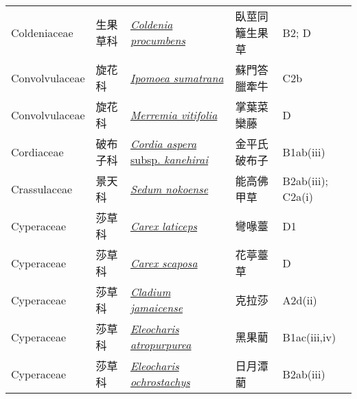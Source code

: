{\begin{longtable}{p{2.5cm}p{2.5cm}p{4.5cm}p{2.5cm}p{3cm}}
    Coldeniaceae & 生果草科 & \href{http://www.theplantlist.org/tpl1.1/search?q=Coldenia+procumbens}{\textit{Coldenia procumbens} } & 臥莖同籬生果草 & B2; D \index{Coldenia@\textit{Coldenia}!procumbens@\textit{procumbens}}  \index{臥莖同籬生果草} \\
    Convolvulaceae & 旋花科 & \href{http://www.theplantlist.org/tpl1.1/search?q=Ipomoea+sumatrana}{\textit{Ipomoea sumatrana} } & 蘇門答臘牽牛 & C2b \index{Ipomoea@\textit{Ipomoea}!sumatrana@\textit{sumatrana}}  \index{蘇門答臘牽牛} \\
    Convolvulaceae & 旋花科 & \href{http://www.theplantlist.org/tpl1.1/search?q=Merremia+vitifolia}{\textit{Merremia vitifolia} } & 掌葉菜欒藤 & D \index{Merremia@\textit{Merremia}!vitifolia@\textit{vitifolia}}  \index{掌葉菜欒藤} \\
    Cordiaceae & 破布子科 & \href{http://www.theplantlist.org/tpl1.1/search?q=Cordia+aspera+subsp.+kanehirai}{\textit{Cordia aspera} subsp. \textit{kanehirai} } & 金平氏破布子 & B1ab(iii) \index{Cordia@\textit{Cordia}!aspera@\textit{aspera}!subsp. kanehirai@subsp. \textit{kanehirai}}  \index{金平氏破布子} \\
    Crassulaceae & 景天科 & \href{http://www.theplantlist.org/tpl1.1/search?q=Sedum+nokoense}{\textit{Sedum nokoense} } & 能高佛甲草 & B2ab(iii); C2a(i) \index{Sedum@\textit{Sedum}!nokoense@\textit{nokoense}}  \index{能高佛甲草} \\
    Cyperaceae & 莎草科 & \href{http://www.theplantlist.org/tpl1.1/search?q=Carex+laticeps}{\textit{Carex laticeps} } & 彎喙薹 & D1 \index{Carex@\textit{Carex}!laticeps@\textit{laticeps}}  \index{彎喙薹} \\
    Cyperaceae & 莎草科 & \href{http://www.theplantlist.org/tpl1.1/search?q=Carex+scaposa}{\textit{Carex scaposa} } & 花葶薹草 & D \index{Carex@\textit{Carex}!scaposa@\textit{scaposa}}  \index{花葶薹草} \\
    Cyperaceae & 莎草科 & \href{http://www.theplantlist.org/tpl1.1/search?q=Cladium+jamaicense}{\textit{Cladium jamaicense} } & 克拉莎 & A2d(ii) \index{Cladium@\textit{Cladium}!jamaicense@\textit{jamaicense}}  \index{克拉莎} \\
    Cyperaceae & 莎草科 & \href{http://www.theplantlist.org/tpl1.1/search?q=Eleocharis+atropurpurea}{\textit{Eleocharis atropurpurea} } & 黑果藺 & B1ac(iii,iv) \index{Eleocharis@\textit{Eleocharis}!atropurpurea@\textit{atropurpurea}}  \index{黑果藺} \\
    Cyperaceae & 莎草科 & \href{http://www.theplantlist.org/tpl1.1/search?q=Eleocharis+ochrostachys}{\textit{Eleocharis ochrostachys} } & 日月潭藺 & B2ab(iii) \index{Eleocharis@\textit{Eleocharis}!ochrostachys@\textit{ochrostachys}}  \index{日月潭藺} \\

\end{longtable}}

